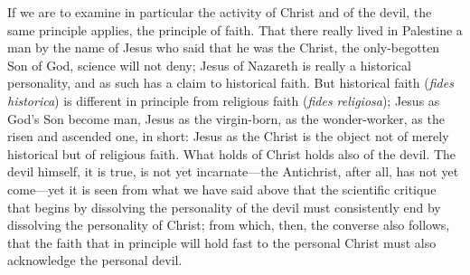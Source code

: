 \documentclass[12pt,a4paper]{article}
\newcommand{\opage}[1]{\marginnote{\footnotesize\textit{[#1]}}}
\begin{document}
If we are to examine in particular the activity of Christ and of the
devil, the same principle applies, the principle of faith. That there
really lived in Palestine a man by the name of Jesus who said that he was
the Christ, the only-begotten Son of God, science will not deny; Jesus of
Nazareth is really a historical personality, and as such has a claim to
historical faith. But historical faith (\textit{fides historica}) is
different in principle from religious faith (\textit{fides religiosa});
Jesus as God's Son become man, Jesus as the virgin-born, as the
wonder-worker, as the risen and ascended one, in short: Jesus as the
Christ is the object not of merely historical but of religious faith.
What holds of Christ holds also of the devil. The devil himself, it is
true, is not yet incarnate---the Antichrist, after all, has not yet
come---yet it is seen from what we have said above that the scientific
critique that begins by
\opage{52}dissolving the personality of the devil must consistently end by
dissolving the personality of Christ; from which, then, the converse also
follows, that the faith that in principle will hold fast to the personal
Christ must also acknowledge the personal devil.
\end{document}
